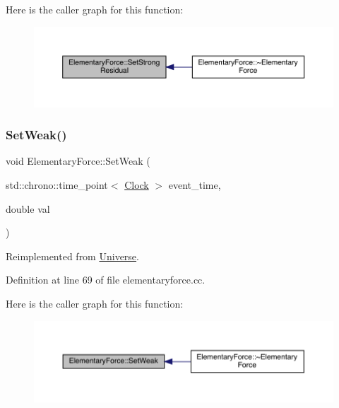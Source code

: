 Here is the caller graph for this function\+:
\nopagebreak
\begin{figure}[H]
\begin{center}
\leavevmode
\includegraphics[width=350pt]{class_elementary_force_ac25021d38c1d54bf711096ab37a461f6_icgraph}
\end{center}
\end{figure}
\mbox{\label{class_elementary_force_a093cdf0810e95f1d973bd9dc88c6788b}} 
\subsubsection{\texorpdfstring{Set\+Weak()}{SetWeak()}}
{\footnotesize\ttfamily void Elementary\+Force\+::\+Set\+Weak (\begin{DoxyParamCaption}\item[{std\+::chrono\+::time\+\_\+point$<$ \hyperlink{universe_8h_a0ef8d951d1ca5ab3cfaf7ab4c7a6fd80}{Clock} $>$}]{event\+\_\+time,  }\item[{double}]{val }\end{DoxyParamCaption})\hspace{0.3cm}{\ttfamily [virtual]}}



Reimplemented from \hyperlink{class_universe_a0f5cd04081b41ee931c0557dc397f6fb}{Universe}.



Definition at line 69 of file elementaryforce.\+cc.

Here is the caller graph for this function\+:
\nopagebreak
\begin{figure}[H]
\begin{center}
\leavevmode
\includegraphics[width=350pt]{class_elementary_force_a093cdf0810e95f1d973bd9dc88c6788b_icgraph}
\end{center}
\end{figure}
\mbox{\label{class_elementary_force_a38d4f86f18a9f84a4198ee43bc90f6b4}} 
